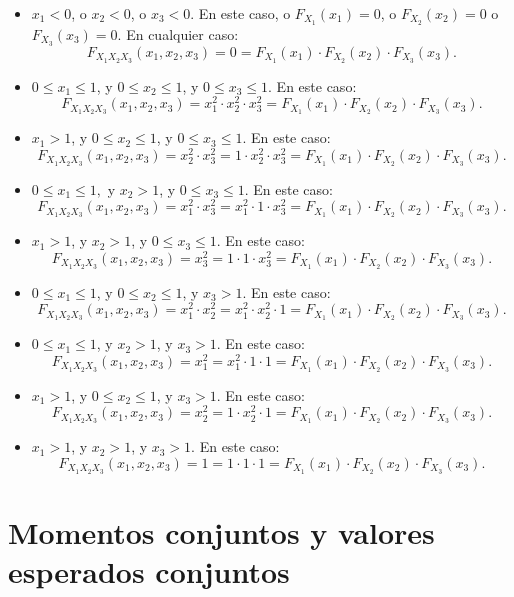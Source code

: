 \documentclass[]{book}
\begin{document}
\begin{itemize}
\item
  \(x_1<0\), o \(x_2<0\), o \(x_3 <0\). En este caso, o \(F_{X_1}(x_1)=0\), o \(F_{X_2}(x_2)=0\) o \(F_{X_3}(x_3)=0\). En cualquier caso:
  \[
  F_{X_1X_2X_3}(x_1,x_2,x_3)=0= F_{X_1}(x_1)\cdot F_{X_2}(x_2)\cdot F_{X_3}(x_3).
  \]
\item
  \(0\leq x_1\leq 1\), y \(0\leq x_2\leq 1\), y \(0\leq x_3\leq 1\). En este caso:
  \[
  F_{X_1X_2X_3}(x_1,x_2,x_3)=x_1^2\cdot x_2^2\cdot x_3^2= F_{X_1}(x_1)\cdot F_{X_2}(x_2)\cdot F_{X_3}(x_3).
  \]
\item
  \(x_1> 1\), y \(0\leq x_2\leq 1\), y \(0\leq x_3\leq 1\). En este caso:
  \[
  F_{X_1X_2X_3}(x_1,x_2,x_3)=x_2^2\cdot x_3^2=1\cdot x_2^2\cdot x_3^2= F_{X_1}(x_1)\cdot F_{X_2}(x_2)\cdot F_{X_3}(x_3).
  \]
\item
  \(0\leq x_1\leq 1,\) y \(x_2> 1\), y \(0\leq x_3\leq 1\). En este caso:
  \[
  F_{X_1X_2X_3}(x_1,x_2,x_3)=x_1^2\cdot x_3^2=x_1^2\cdot 1\cdot x_3^2= F_{X_1}(x_1)\cdot F_{X_2}(x_2)\cdot F_{X_3}(x_3).
  \]
\item
  \(x_1> 1\), y \(x_2> 1\), y \(0\leq x_3\leq 1\). En este caso:
  \[
  F_{X_1X_2X_3}(x_1,x_2,x_3)=x_3^2=1\cdot 1\cdot x_3^2= F_{X_1}(x_1)\cdot F_{X_2}(x_2)\cdot F_{X_3}(x_3).
  \]
\item
  \(0\leq x_1\leq 1\), y \(0\leq x_2\leq 1\), y \(x_3> 1\). En este caso:
  \[
  F_{X_1X_2X_3}(x_1,x_2,x_3)=x_1^2\cdot x_2^2=x_1^2\cdot x_2^2\cdot 1= F_{X_1}(x_1)\cdot F_{X_2}(x_2)\cdot F_{X_3}(x_3).
  \]
\item
  \(0\leq x_1\leq 1\), y \(x_2 > 1\), y \(x_3> 1\). En este caso:
  \[
  F_{X_1X_2X_3}(x_1,x_2,x_3)=x_1^2=x_1^2\cdot 1\cdot 1= F_{X_1}(x_1)\cdot F_{X_2}(x_2)\cdot F_{X_3}(x_3).
  \]
\item
  \(x_1> 1\), y \(0\leq x_2 \leq 1\), y \(x_3> 1\). En este caso:
  \[
  F_{X_1X_2X_3}(x_1,x_2,x_3)=x_2^2=1\cdot x_2^2\cdot 1= F_{X_1}(x_1)\cdot F_{X_2}(x_2)\cdot F_{X_3}(x_3).
  \]
\item
  \(x_1> 1\), y \(x_2>1\), y \(x_3> 1\). En este caso:
  \[
  F_{X_1X_2X_3}(x_1,x_2,x_3)=1=1\cdot 1\cdot 1= F_{X_1}(x_1)\cdot F_{X_2}(x_2)\cdot F_{X_3}(x_3).
  \]
\end{itemize}

\hypertarget{momentos-conjuntos-y-valores-esperados-conjuntos-1}{%
\section{Momentos conjuntos y valores esperados conjuntos}\label{momentos-conjuntos-y-valores-esperados-conjuntos-1}}
\end{document}
